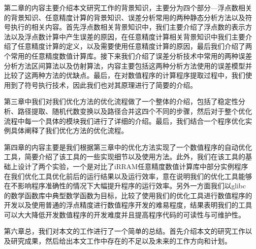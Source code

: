 第二章的内容主要介绍本文研究工作的背景知识，主要分为四个部分---浮点数相关的背景知识、任意精度计算的背景知识、误差分析常用的两种静态分析方法以及符号执行的相关内容。首先浮点数相关背景知识中，我们主要介绍了浮点数的表示方法以及浮点数计算中产生误差的原因，在任意精度计算相关背景知识中我们主要介绍了任意精度计算的定义，以及需要使用任意精度计算的原因，最后我们介绍了两个常用的任意精度数值计算库。接下来我们介绍了误差分析技术中常用的两种误差分析方法区间算法以及仿射算法，内容主要包括这两种分析方法使用的误差模型并比较了这两种方法的优缺点。最后，在对数值程序的计算程序提取过程中，我们使用到了符号执行技术，因此我们也对其原理进行了简要的介绍。

第三章中我们对我们优化方法的优化流程做了一个整体的介绍，包括了稳定性分析、路径提取、随机代数变换以及路径合并这四个不同的步骤，然后对于整个优化流程中每一个具体的模块我们进行了详细的介绍。最后，我们结合一个程序优化实例具体阐释了我们优化方法的优化流程。

第四章的内容主要是我们根据第三章中的优化方法实现了一个数值程序的自动优化工具，简要介绍了该工具的一些实现细节以及使用方法。此外，我们在该工具的基础上设计了两个实验，一个是对比了iRRAM任意精度数值计算库中部分实例程序在我们优化工具优化前后的运行结果以及运行效率，意在说明我们的优化工具能够在不影响程序准确性的情况下大幅提升程序的运行效率。另外一方面我们以glibc的数学函数库中典型数学函数为目标，比较了使用我们的优化工具进行数值程序的开发以及使用普通的浮点精度进行数值程序开发的难易程度，结果表明我们的工具可以大大降低开发数值程序的开发难度并且提高程序代码的可读性与可维护性。

第六章总，我们对本文的工作进行了一个简单的总结。首先介绍本文的研究工作以及研究成果，然后给出本文工作中存在的不足以及未来的工作方向和计划。
